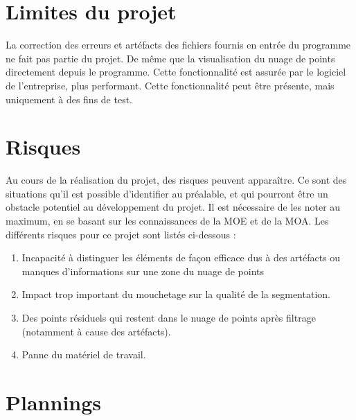 \documentclass[12pt,titlepage,french]{article}
\begin{document}
\section{Limites du projet}

La correction des erreurs et artéfacts des fichiers fournis en entrée du programme ne fait pas partie du projet.
De même que la visualisation du nuage de points directement depuis le programme. Cette fonctionnalité est assurée par le logiciel de l'entreprise, plus performant. Cette fonctionnalité peut être présente, mais uniquement à des fins de test.

\section{Risques}

Au cours de la réalisation du projet, des risques peuvent apparaître. Ce sont des situations qu'il est possible d'identifier au préalable, et qui pourront être un obstacle potentiel au développement du projet. Il est nécessaire de les noter au maximum, en se basant sur les connaissances de la MOE et de la MOA. Les différents risques pour ce projet sont listés ci-dessous :
\begin{enumerate}
\item Incapacité à distinguer les éléments de façon efficace dus à des artéfacts ou manques d'informations sur une zone du nuage de points
\item Impact trop important du mouchetage sur la qualité de la segmentation.
\item Des points résiduels qui restent dans le nuage de points après filtrage (notamment à cause des artéfacts).
\item Panne du matériel de travail.
\end{enumerate}

\section{Plannings}
\end{document}
